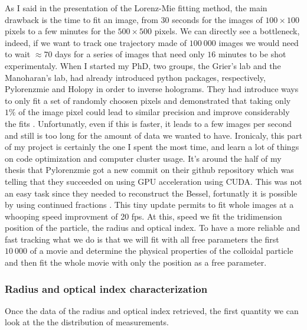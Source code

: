 As I said in the presentation of the Lorenz-Mie fitting method, the main drawback is the time to fit an image, from $30$ seconds for the images of $100 \times 100$ pixels to a few minutes for the $500\times 500$ pixels. We can directly see a bottleneck, indeed, if we want to track one trajectory made of $100~000$ images we would need to wait $\approx 70$ days for a series of images that need only $16$ minutes to be shot experimentaly. When I started my PhD, two groups, the Grier's lab and the Manoharan's lab, had already introduced python packages, respectively, Pylorenzmie and Holopy in order to inverse holograms. They had introduce ways to only fit a set of randomly choosen pixels and demonstrated that taking only $1\%$ of the image pixel could lead to similar precision and improve considerably the fits \cite{dimiduk_random-subset_2014}. Unfortunatly, even if this is faster, it leads to a few images per second and still is too long for the amount of data we wanted to have. Ironicaly, this part of my project is certainly the one I spent the most time, and learn a lot of things on code optimization and computer cluster usage. It's around the half of my thesis that Pylorenzmie got a new commit on their github repository which was telling that they succeeded on using GPU acceleration using CUDA. This was not an easy task since they needed to reconstruct the Bessel, fortunatly it is possible by using continued fractions \cite{lentz_generating_1976}. This tiny update permits to fit whole images at a whooping speed improvment of 20 fps. At this, speed we fit the tridimension position of the particle, the radius and optical index. To have a more reliable and fast tracking what we do is that we will fit with all free parameters the first $10~000$ of a movie and determine the physical properties of the colloidal particle and then fit the whole movie with only the position as a free parameter.

\subsubsection{Radius and optical index characterization}


Once the data of the radius and optical index retrieved, the first quantity we can look at the the distribution of measurements.

